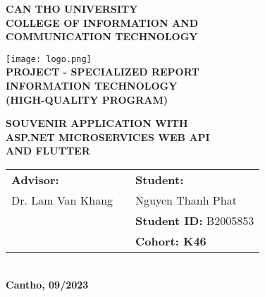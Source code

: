 
\begin{titlepage}
    \begin{center}

        \textbf{CAN THO UNIVERSITY\\}
        \textbf{COLLEGE OF INFORMATION AND\\ COMMUNICATION TECHNOLOGY\\[1cm]}

        \texttt{[image: logo.png]}\\[1cm]

        \textbf{PROJECT - SPECIALIZED REPORT \\}
        \textbf{  INFORMATION TECHNOLOGY \\}
        \textbf{(HIGH-QUALITY PROGRAM)\\[2cm]}

        \textbf{{\Large SOUVENIR APPLICATION WITH\\ASP.NET MICROSERVICES WEB API\\ AND FLUTTER}}
        \\[3.5cm]

        \begin{tabular}{ l c l l }
            \textbf{Advisor:} & \hspace{2cm} & \multicolumn{2}{l}{\textbf{Student:}}             \\
            Dr. Lam Van Khang &              & Nguyen Thanh Phat                                 \\
                              &              & \multicolumn{2}{l}{\textbf{Student ID:} B2005853} \\
                              &              & \multicolumn{2}{l}{\textbf{Cohort: K46}}
        \end{tabular}
        \\[4cm]

        \textbf{Cantho, 09/2023}

    \end{center}

\end{titlepage}